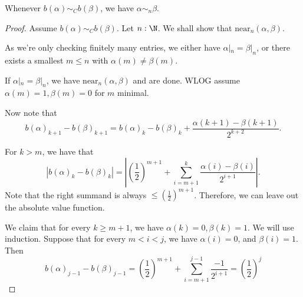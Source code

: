 \begin{lemma}
  Whenever $b(\alpha) \sim_C b(\beta)$, 
  we have $\alpha \sim_n \beta$. 
\end{lemma}
\begin{proof}
  Assume $b(\alpha) \sim_Cb (\beta)$. 
  Let $n:\N$. 
  We shall show that $\text{near}_n(\alpha , \beta)$. 

  As we're only checking finitely many entries, 
  we either have $\alpha|_n = \beta|_n$, 
  or there exists a smallest $m\leq n$ with 
  $\alpha(m) \neq \beta(m)$. 

  If $\alpha|_n = \beta|_n$, we have $\text{near}_n(\alpha,\beta)$ and are done. 
  WLOG assume $\alpha(m) = 1, \beta(m) = 0$ for $m$ minimal. 

  Now note that 
  \begin{equation} 
    b(\alpha)_{k+1} - b(\beta)_{k+1} = 
    b(\alpha)_{k} - b(\beta)_{k} + 
    \frac{\alpha(k+1) - \beta(k+1)}{2^{k+2}}.
  \end{equation}

  For $k>m$, we have that 
  \begin{equation}
  |b(\alpha)_k - b(\beta)_k |= 
  |(\frac12)^{m+1} + \sum\limits_{i=m+1}^k \frac{ \alpha(i) -\beta(i)}{2^{i+1}}|. 
  \end{equation}
  Note that the right summand is always $\leq (\frac12)^{m+1}$. 
  Therefore, we can leave out the absolute value function. 

  We claim that for every $k\geq m+1$, we have $\alpha(k) = 0, \beta(k) = 1$. 
  We will use induction. 
  Suppose that for every $m <i<j$, we have $\alpha(i) = 0$, and $\beta(i) = 1$. 
  Then 
  \begin{equation}
    b(\alpha)_{j-1} - b(\beta)_{j-1} = 
    (\frac12)^{m+1} + 
    \sum\limits_{i=m+1}^{j-1} \frac{ -1}{2^{i+1}} 
    = (\frac12)^{j}
  \end{equation}
   

\end{proof}

